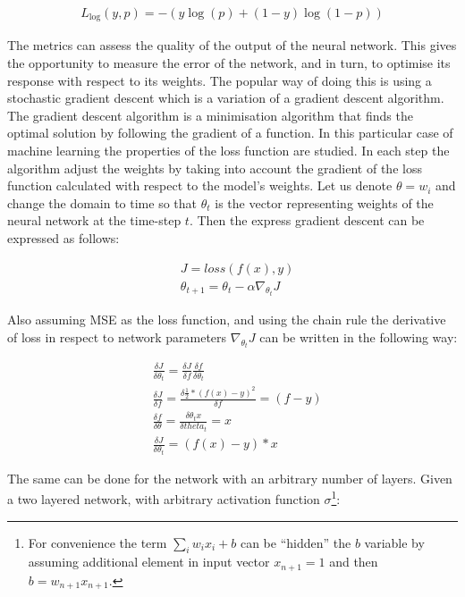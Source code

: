 \begin{align}
 L_{\log}(y, p) = -(y \log (p) + (1 - y) \log (1 - p))
\label{eq:logloss}
\end{align}

The metrics can assess the quality of the output of the neural network.
This gives the opportunity to measure the error of the network, and in turn, to optimise its response with respect to its weights.
The popular way of doing this is using a stochastic gradient descent which is a variation of a gradient descent algorithm.
The gradient descent algorithm is a minimisation algorithm that finds the optimal solution by following the gradient of a function. 
In this particular case of machine learning the properties of the loss function are studied.
In each step the algorithm adjust the weights by taking into account the gradient of the loss function calculated with respect to the model's weights.
Let us denote $\theta = w_{i}$ and change the domain to time so that $\theta_{t}$ is the vector representing weights of the neural network at the time-step $t$.
Then the express gradient descent can be expressed as follows:

\begin{align}
& J = loss(f(x), y) \\
& \theta_{t+1} = \theta_{t} - \alpha \nabla_{\theta_{t}}J
\end{align}

Also assuming MSE as the loss function, and using the chain rule the derivative of loss in respect to network parameters $\nabla_{\theta_{t}}J$ can be written in the following way:

\begin{align}
& \frac{\delta J}{\delta \theta_{t}} = \frac{\delta J}{\delta f }\frac{\delta f}{\delta \theta_{t}} \\
& \frac{\delta J}{\delta f } = \frac{\delta \frac{1}{2}*(f(x)-y)^{2}}{\delta f} = (f - y) \\
& \frac{\delta f}{\delta \theta } = \frac{\delta \theta_{t}x}{\delta theta_{t}} = x \\
& \frac{\delta J}{\delta \theta_{t}} = (f(x)-y)*x 
\end{align}

The same can be done for the network with an arbitrary number of layers. Given a two layered network, with arbitrary activation function $\sigma$\footnote{For convenience the term $\sum_{i} w_{i}x_{i} + b$  can be ``hidden'' the $b$ variable by assuming additional element in input vector $x_{n+1} = 1$ and then $b=w_{n+1}x_{n+1}$.}:

